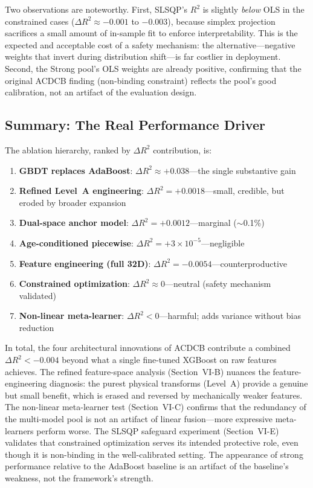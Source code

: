 \documentclass[journal]{IEEEtran}
\begin{document}
Two observations are noteworthy. First, SLSQP's $R^2$ is slightly \emph{below} OLS in the constrained cases ($\Delta R^2 \approx -0.001$ to $-0.003$), because simplex projection sacrifices a small amount of in-sample fit to enforce interpretability. This is the expected and acceptable cost of a safety mechanism: the alternative---negative weights that invert during distribution shift---is far costlier in deployment. Second, the Strong pool's OLS weights are already positive, confirming that the original ACDCB finding (non-binding constraint) reflects the pool's good calibration, not an artifact of the evaluation design.

\subsection{Summary: The Real Performance Driver}

The ablation hierarchy, ranked by $\Delta R^2$ contribution, is:
\begin{enumerate}
\item \textbf{GBDT replaces AdaBoost}: $\Delta R^2 \approx +0.038$---the single substantive gain
\item \textbf{Refined Level~A engineering}: $\Delta R^2 = +0.0018$---small, credible, but eroded by broader expansion
\item \textbf{Dual-space anchor model}: $\Delta R^2 = +0.0012$---marginal ($\sim$0.1\%)
\item \textbf{Age-conditioned piecewise}: $\Delta R^2 = +3 \times 10^{-5}$---negligible
\item \textbf{Feature engineering (full 32D)}: $\Delta R^2 = -0.0054$---counterproductive
\item \textbf{Constrained optimization}: $\Delta R^2 \approx 0$---neutral (safety mechanism validated)
\item \textbf{Non-linear meta-learner}: $\Delta R^2 < 0$---harmful; adds variance without bias reduction
\end{enumerate}

In total, the four architectural innovations of ACDCB contribute a combined $\Delta R^2 < -0.004$ beyond what a single fine-tuned XGBoost on raw features achieves. The refined feature-space analysis (Section~VI-B) nuances the feature-engineering diagnosis: the purest physical transforms (Level~A) provide a genuine but small benefit, which is erased and reversed by mechanically weaker features. The non-linear meta-learner test (Section~VI-C) confirms that the redundancy of the multi-model pool is not an artifact of linear fusion---more expressive meta-learners perform worse. The SLSQP safeguard experiment (Section~VI-E) validates that constrained optimization serves its intended protective role, even though it is non-binding in the well-calibrated setting. The appearance of strong performance relative to the AdaBoost baseline is an artifact of the baseline's weakness, not the framework's strength.
\end{document}
